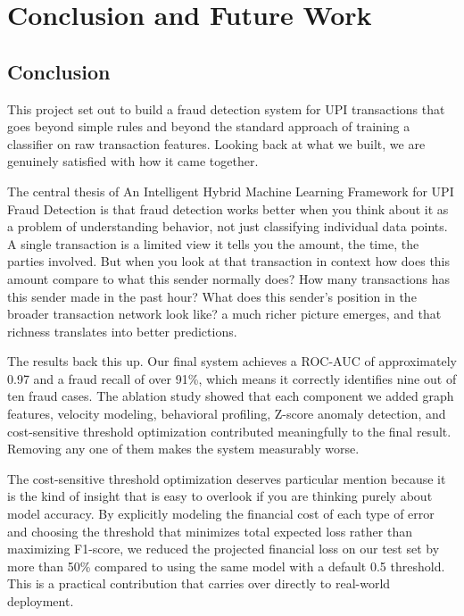 \chapter{Conclusion and Future Work}

\section{Conclusion}

This project set out to build a fraud detection system for UPI transactions that goes beyond simple rules and beyond the standard approach of training a classifier on raw transaction features. Looking back at what we built, we are genuinely satisfied with how it came together.

The central thesis of An Intelligent Hybrid Machine Learning Framework for UPI Fraud Detection is that fraud detection works better when you think about it as a problem of understanding behavior, not just classifying individual data points. A single transaction is a limited view it tells you the amount, the time, the parties involved. But when you look at that transaction in context how does this amount compare to what this sender normally does? How many transactions has this sender made in the past hour? What does this sender's position in the broader transaction network look like? a much richer picture emerges, and that richness translates into better predictions.

The results back this up. Our final system achieves a ROC-AUC of approximately 0.97 and a fraud recall of over 91\%, which means it correctly identifies nine out of ten fraud cases. The ablation study showed that each component we added graph features, velocity modeling, behavioral profiling, Z-score anomaly detection, and cost-sensitive threshold optimization contributed meaningfully to the final result. Removing any one of them makes the system measurably worse.

The cost-sensitive threshold optimization deserves particular mention because it is the kind of insight that is easy to overlook if you are thinking purely about model accuracy. By explicitly modeling the financial cost of each type of error and choosing the threshold that minimizes total expected loss rather than maximizing F1-score, we reduced the projected financial loss on our test set by more than 50\% compared to using the same model with a default 0.5 threshold. This is a practical contribution that carries over directly to real-world deployment.

